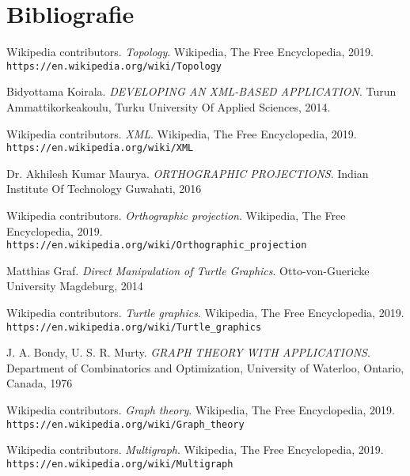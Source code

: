 \newpage
\section{Bibliografie}

\begin{thebibliography}{9}

    Wikipedia contributors. 
    \textit{Topology}. 
    Wikipedia, The Free Encyclopedia, 2019. 
    \\\texttt{https://en.wikipedia.org/wiki/Topology}

    Bidyottama Koirala.
    \textit{DEVELOPING AN XML-BASED APPLICATION}.  
    Turun Ammattikorkeakoulu, Turku University Of Applied Sciences, 2014.
     
    Wikipedia contributors. 
    \textit{XML}. 
    Wikipedia, The Free Encyclopedia, 2019. 
    \\\texttt{https://en.wikipedia.org/wiki/XML}

    Dr. Akhilesh Kumar Maurya.
    \textit{ORTHOGRAPHIC PROJECTIONS}.
    Indian Institute Of Technology Guwahati, 2016
    
    Wikipedia contributors. 
    \textit{Orthographic projection}. 
    Wikipedia, The Free Encyclopedia, 2019.
    \\\texttt{https://en.wikipedia.org/wiki/Orthographic\_projection}

    Matthias Graf.
    \textit{Direct Manipulation of Turtle Graphics}.
    Otto-von-Guericke University Magdeburg, 2014

    Wikipedia contributors. 
    \textit{Turtle graphics}. 
    Wikipedia, The Free Encyclopedia, 2019. 
    \\\texttt{https://en.wikipedia.org/wiki/Turtle\_graphics}

    J. A. Bondy, U. S. R. Murty.
    \textit{GRAPH THEORY WITH APPLICATIONS}. 
    Department of Combinatorics and Optimization, University of Waterloo, Ontario, Canada, 1976
    
    Wikipedia contributors. 
    \textit{Graph theory}. 
    Wikipedia, The Free Encyclopedia, 2019.
    \\\texttt{https://en.wikipedia.org/wiki/Graph\_theory}
    
    Wikipedia contributors. 
    \textit{Multigraph}. 
    Wikipedia, The Free Encyclopedia, 2019.
    \\\texttt{https://en.wikipedia.org/wiki/Multigraph}


\end{thebibliography}
